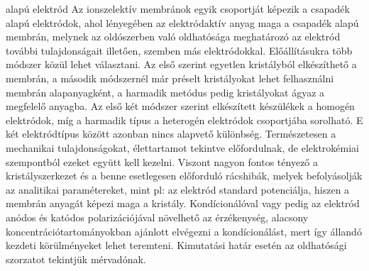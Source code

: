 { alapú elektród
Az ionszelektív membránok egyik csoportját képezik a csapadék alapú elektródok, ahol  lényegében az elektródaktív anyag maga a csapadék alapú membrán, melynek  az oldószerben való oldhatósága meghatározó az elektród további tulajdonságait illetően, szemben más elektródokkal.
 Előállításukra több módszer közül lehet választani. Az első szerint egyetlen kristályból elkészíthető a membrán, a második módszernél már préselt kristályokat lehet felhasználni membrán alapanyagként, a  harmadik  metódus pedig kristályokat ágyaz a megfelelő anyagba. Az első két módszer szerint elkészített készülékek a homogén elektródok, míg a harmadik típus a heterogén elektródok csoportjába sorolható. E két elektródtípus között azonban nincs alapvető különbség. Természetesen a mechanikai tulajdonságokat, élettartamot tekintve előfordulnak, de elektrokémiai szempontból ezeket együtt kell kezelni. Viszont nagyon fontos tényező a kristályszerkezet és a benne esetlegesen előforduló rácshibák, melyek befolyásolják az analitikai paramétereket, mint pl: az elektród standard potenciálja, hiszen a membrán anyagát képezi maga a kristály.
Kondícionálóval vagy pedig az elektród anódos és katódos polarizációjával növelhető az érzékenység, alacsony koncentrációtartományokban ajánlott elvégezni a kondícionálást, mert így állandó kezdeti körülményeket lehet teremteni.  Kimutatási határ esetén az oldhatósági szorzatot tekintjük mérvadónak.
}
